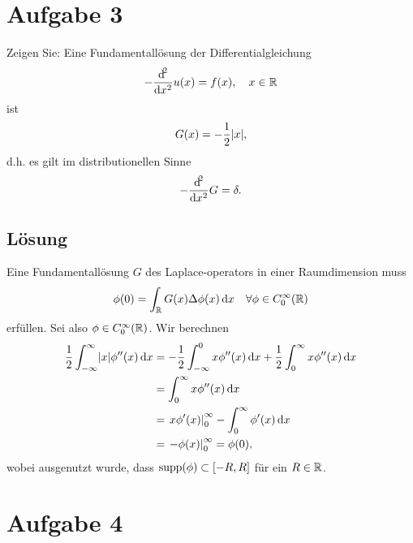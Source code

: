 \documentclass{exercise}
\begin{document}
    \section*{Aufgabe 3}
    
    \begin{problem}
        Zeigen Sie: Eine Fundamentallösung der Differentialgleichung
        \[
            -\frac{\d^2}{\d x^2}u\parentheses*{x} = f\parentheses*{x}, \quad x \in \R
        \]
        ist
        \[
            G\parentheses*{x} = -\frac{1}{2}\absolute*{x},
        \]
        d.h. es gilt im distributionellen Sinne
        \[
            -\frac{\mathop{\mathrm{d}\!}^2}{\mathop{\mathrm{d}\!} x^2}G = \delta.
        \]
    \end{problem}
    
    \subsection*{Lösung}
    Eine Fundamentallösung \(G\) des  Laplace-operators in einer Raumdimension muss
    \[
        \phi\parentheses*{0} = \int_\R G\parentheses*{x}\Delta\phi\parentheses*{x}\d x \quad \forall\phi \in C_0^\infty\parentheses*{\R}
    \]
    erfüllen.
    Sei also \(\phi \in C_0^\infty\parentheses*{\R}\).
    Wir berechnen
    \begin{align*}
        \frac{1}{2}\int_{-\infty}^\infty \absolute*{x}\phi''\parentheses*{x}\d x &= -\frac{1}{2}\int_{-\infty}^0 x\phi''\parentheses*{x}\d x + \frac{1}{2}\int_0^\infty x\phi''\parentheses*{x}\d x\\
        &= \int_0^\infty x\phi''\parentheses*{x}\d x\\
        &= \left.x\phi'\parentheses*{x}\right|_0^\infty - \int_0^\infty \phi'\parentheses*{x}\d x\\
        &= \left.-\phi\parentheses*{x}\right|_0^\infty = \phi\parentheses*{0},
    \end{align*}
    wobei ausgenutzt wurde, dass \(\supp\parentheses*{\phi} \subset \brackets*{-R, R}\) für ein \(R \in \mathbb{R}\).


    \section*{Aufgabe 4}
    
\end{document}
